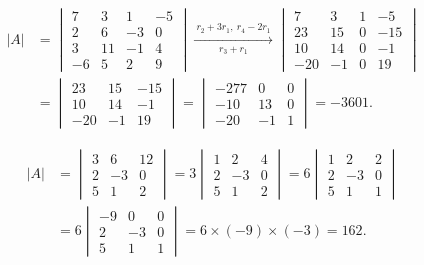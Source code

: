 \begin{example}
\begin{align*}
|A|&=\begin{vmatrix}
7&3&1&-5\\
2&6&-3&0\\
3&11&-1&4\\
-6&5&2&9
\end{vmatrix}
\xrightarrow[r_3+r_1]{\ r_2+3r_1,\ r_4-2r_1\ }
\begin{vmatrix}
7&3&1&-5\\
23&15&0&-15\\
10&14&0&-1\\
-20&-1&0&19
\end{vmatrix}\\
&=\begin{vmatrix}
23&15&-15\\
10&14&-1\\
-20&-1&19
\end{vmatrix}
=\begin{vmatrix}
-277&0&0\\
-10&13&0\\
-20&-1&1
\end{vmatrix}=-3601.
\end{align*}
\end{example}

\begin{example}
\begin{align*}
|A|&=\begin{vmatrix}
3&6&12\\
2&-3&0\\
5&1&2
\end{vmatrix}
=3\begin{vmatrix}
1&2&4\\
2&-3&0\\
5&1&2
\end{vmatrix}
=6\begin{vmatrix}
1&2&2\\
2&-3&0\\
5&1&1
\end{vmatrix}\\
&=6\begin{vmatrix}
-9&0&0\\
2&-3&0\\
5&1&1
\end{vmatrix}
=6\times(-9)\times(-3)=162.
\end{align*}
\end{example}

